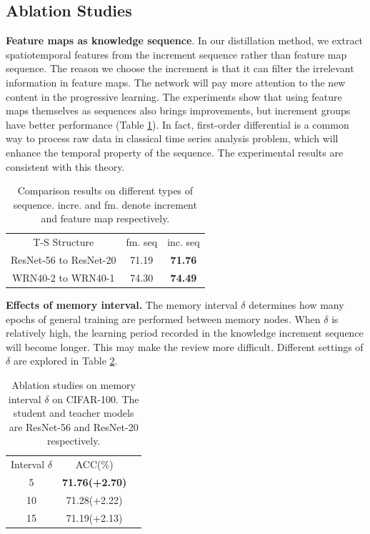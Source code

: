 \documentclass[letterpaper]{article} %
\begin{document}
\subsection{Ablation Studies}
\textbf{Feature maps as knowledge sequence}. In our distillation method, we extract spatiotemporal features from the increment sequence rather than feature map sequence. The reason we choose the increment is that it can filter the irrelevant information in feature maps. The network will pay more attention to the new content in the progressive learning.  The experiments show that using feature maps themselves as sequences also brings improvements, but increment groups have better performance (Table \ref{tab5}). In fact, first-order differential is a common way to process raw data in classical time series analysis problem, which will enhance the temporal property of the sequence. The experimental results are consistent with this theory.
\begin{table}[htbp]
\centering
\begin{tabular}{@{}c|cc@{}}
 T-S Structure  & fm. seq & inc. seq
\\ \Xhline{1.5pt}
 ResNet-56 to ResNet-20 & 71.19 &\textbf{71.76}
\\ \hline
 WRN40-2 to WRN40-1 &74.30 &\textbf{74.49}
\end{tabular}
\caption{Comparison results on different types of sequence. incre. and fm. denote increment and feature map respectively. }
\label{tab5}
\end{table}

\noindent\textbf{Effects of memory interval.} The memory interval $\delta$ determines how many epochs of general training are performed between memory nodes. When $\delta$ is relatively high, the learning period recorded in the knowledge increment sequence will become longer. This may make the review more difficult. Different settings of $\delta$ are explored in Table \ref{tab6}.
\begin{table}[htbp]
\centering
\begin{tabular}{@{}c|cc@{}}
 Interval $\delta$ & ACC($\%$)
\\ \Xhline{1.5pt}
 5 &\textbf{71.76(+2.70)}
\\ \hline
10 &71.28(+2.22)
\\ \hline
15 &71.19(+2.13)
\end{tabular}
\caption{Ablation studies on memory interval $\delta$ on CIFAR-100. The student and teacher models are ResNet-56 and ResNet-20 respectively. }
\label{tab6}
\end{table}
\end{document}
